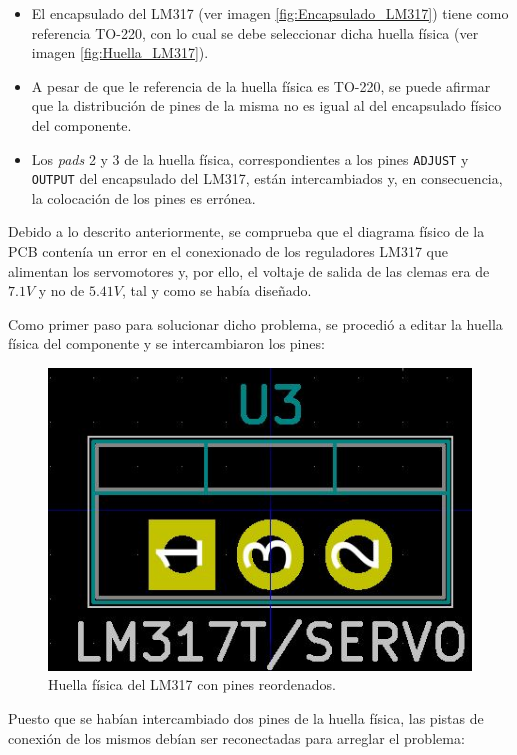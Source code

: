 \begin{itemize}
\begin{itemize}
        \item El encapsulado del LM317 (ver imagen \ref{fig:Encapsulado_LM317}) tiene como referencia TO-220, con lo cual se debe seleccionar dicha huella física (ver imagen \ref{fig:Huella_LM317}).
        
        \item A pesar de que le referencia de la huella física es TO-220, se puede afirmar que la distribución de pines de la misma no es igual al del encapsulado físico del componente.
        
        \item Los \textit{pads} 2 y 3 de la huella física, correspondientes a los pines \texttt{ADJUST} y \texttt{OUTPUT} del encapsulado del LM317, están intercambiados y, en consecuencia, la colocación de los pines es errónea.
        
    \end{itemize}
    
    Debido a lo descrito anteriormente, se comprueba que el diagrama físico de la \ac{PCB} contenía un error en el conexionado de los reguladores LM317 que alimentan los servomotores y, por ello, el voltaje de salida de las clemas era de $7.1V$ y no de $5.41V$, tal y como se había diseñado.
    
    Como primer paso para solucionar dicho problema, se procedió a editar la huella física del componente y se intercambiaron los pines:
    
    \begin{figure}[H]
    \centering 
    \includegraphics[width=0.45\linewidth]{pictures/FixedLM.JPG}
    \caption{Huella física del LM317 con pines reordenados.}
    \end{figure}
    
    Puesto que se habían intercambiado dos pines de la huella física, las pistas de conexión de los mismos debían ser reconectadas para arreglar el problema:
    

\end{itemize}
